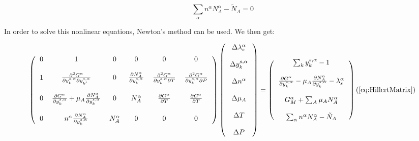 \documentclass[12pt]{article}
\begin{document}
\begin{equation}
\sum_{\alpha}n^{\alpha}N^{\alpha}_{A} - \tilde N_{A}=0
\end{equation}

In order to solve this nonlinear equations, Newton's method can be used.
We then get:


\label{eq:HillertMatrix}

\[
\left(
\begin{tabular}{cccccc}
 0 & 1 & 0 & 0 & 0 &0\\
\\
1 & $\frac{\partial^2 G^{\alpha}}{\partial y_k^{s, \alpha}\partial y_{k^{\prime}}^{s, \alpha}} $ &
0 & $\frac{\partial N^{\alpha}_{A}}{\partial y^{s, \alpha}_{k}}$ 
& $\frac{\partial^2 G^{\alpha}}{\partial y_k^{s, \alpha} \partial T}$ 
& $\frac{\partial^2 G^{\alpha}}{\partial y_k^{s, \alpha} \partial P}$ \\
\\
0 & $\frac{\partial G^{\alpha}}{\partial y_k^{s, \alpha}} + 
\mu_{A}\frac{\partial N^{\alpha}_{A}}{\partial y^{s, \alpha}_{k}}$ 
& 0 & $N^{\alpha}_{A}$ 
& $\frac{\partial G^{\alpha}}{\partial T}$ 
& $\frac{\partial G^{\alpha}}{\partial T}$  \\
\\
 0 & $n^{\alpha}\frac{\partial N^{\alpha}_{A}}{\partial y^{s, \alpha}_{k}}$
 & $N^{\alpha}_{A}$ & 0 & 0 & 0\\
\end{tabular}
\right)
\left(
\begin{tabular}{c}

$\Delta \lambda_s^{\alpha}$\\
\\
$\Delta y^{s, \alpha}_{k}$\\
\\
$\Delta n^{\alpha}$\\
\\
$\Delta \mu_{A}$\\
\\
$\Delta T$\\
\\
$\Delta P$\\
\end{tabular}
\right)
=
\left(
\begin{tabular}{cccccc}
$\sum_k y^{s, \alpha}_{k} - 1$\\
\\
$ \frac{\partial G^{\alpha}}{\partial y^{s, \alpha}_{k}}
- \mu_{A}\frac{\partial N^{\alpha}_{A}}{\partial y^{s, \alpha}_{k}}
- \lambda_s^{\alpha}$\\
\\
$G^{\alpha}_M + \sum_{A} \mu_{A} N^{\alpha}_{A}$\\
\\
$\sum_{\alpha}n^{\alpha}N^{\alpha}_{A} - \tilde N_{A}$\\
\end{tabular}
\right)
\\
\\ (\ref{eq:HillertMatrix})
\]
\end{document}
